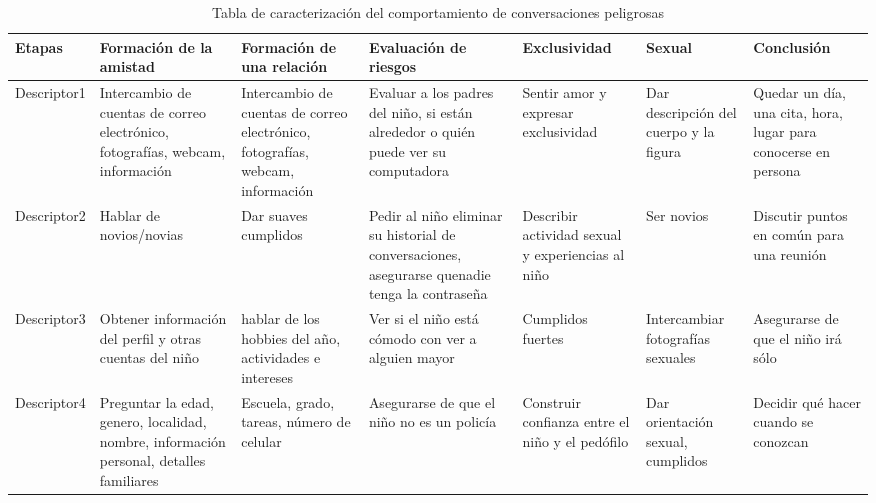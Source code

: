 \begin{table}[!h]

\begin{tabular}[t]{|p{15mm} |p{22mm} |p{22mm} |p{22mm} |p{20mm} |p{20mm} |p{20mm} |}
\hline
\hline
Etapas & Formaci\'on de la amistad & Formaci\'on de una relaci\'on & Evaluaci\'on de riesgos & Exclusividad & Sexual & Conclusi\'on \\
\hline
Descriptor1 & Intercambio de cuentas de correo electr\'onico, fotograf\'ias, webcam, informaci\'on & Intercambio de cuentas de correo electr\'onico, fotograf\'ias, webcam, informaci\'on & Evaluar a los padres del ni\~no, si est\'an alrededor o qui\'en puede ver su computadora & Sentir amor y expresar exclusividad & Dar descripci\'on del cuerpo y la figura & Quedar un d\'ia, una cita, hora, lugar para conocerse en persona \\
\hline
Descriptor2 &Hablar de novios/novias & Dar suaves cumplidos & Pedir al ni\~no eliminar su historial de conversaciones, asegurarse quenadie tenga la contrase\~na & Describir actividad sexual y experiencias al ni\~no &Ser novios &Discutir puntos en com\'un para una reuni\'on \\
\hline
Descriptor3 &Obtener informaci\'on del perfil y otras cuentas del ni\~no & hablar de los hobbies del a\~no, actividades e intereses & Ver si el ni\~no est\'a c\'omodo con ver a alguien mayor& Cumplidos fuertes & Intercambiar fotograf\'ias sexuales & Asegurarse de que el ni\~no ir\'a s\'olo \\
\hline
Descriptor4 & Preguntar la edad, genero, localidad, nombre, informaci\'on personal, detalles familiares & Escuela, grado, tareas, n\'umero de celular & Asegurarse de que el ni\~no no es un polic\'ia & Construir confianza entre el ni\~no y el ped\'ofilo & Dar orientaci\'on sexual, cumplidos & Decidir qu\'e hacer cuando se conozcan\\
\hline
\end{tabular} \\ \\ \\
\caption{Tabla de caracterizaci\'on del comportamiento de conversaciones peligrosas}
\label{table:caracterizacion}
\end{table}




